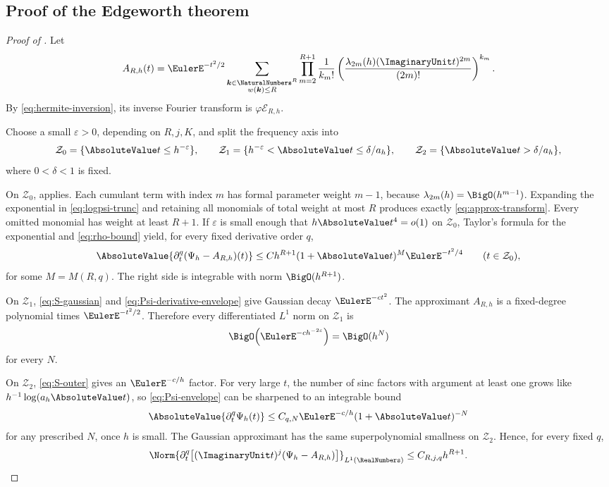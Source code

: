 \documentclass[11pt]{article}
\numberwithin{equation}{section}
\theoremstyle{definition}
\newcommand{\phiN}{\varphi}
\begin{document}
\subsection{Proof of the Edgeworth theorem}
\begin{proof}[Proof of ]
Let
\begin{equation}\label{eq:approx-transform}
 A_{R,h}(t)=\EulerE^{-t^2/2}
 \sum_{\substack{\bm k\in\NaturalNumbers^R\\w(\bm k)\le R}}
 \prod_{m=2}^{R+1}\frac1{k_m!}
 \left(\frac{\lambda_{2m}(h)(\ImaginaryUnit t)^{2m}}{(2m)!}\right)^{k_m}.
\end{equation}
By \eqref{eq:hermite-inversion}, its inverse Fourier transform is \(\phiN\mathcal E_{R,h}\).

Choose a small \(\varepsilon>0\), depending on \(R,j,K\), and split the frequency axis into
\[
 \mathcal Z_0=\{\AbsoluteValue t\le h^{-\varepsilon}\},\qquad
 \mathcal Z_1=\{h^{-\varepsilon}<\AbsoluteValue t\le\delta/a_h\},\qquad
 \mathcal Z_2=\{\AbsoluteValue t>\delta/a_h\},
\]
where \(0<\delta<1\) is fixed.

On \(\mathcal Z_0\),  applies.  Each cumulant term with index \(m\) has formal parameter weight \(m-1\), because \(\lambda_{2m}(h)=\BigO(h^{m-1})\).  Expanding the exponential in \eqref{eq:logpsi-trunc} and retaining all monomials of total weight at most \(R\) produces exactly \eqref{eq:approx-transform}.  Every omitted monomial has weight at least \(R+1\).  If \(\varepsilon\) is small enough that \(h\AbsoluteValue t^4=o(1)\) on \(\mathcal Z_0\), Taylor's formula for the exponential and \eqref{eq:rho-bound} yield, for every fixed derivative order \(q\),
\begin{equation}\label{eq:central-transform-error}
 \AbsoluteValue{\partial_t^q(\Psi_h-A_{R,h})(t)}
 \le C h^{R+1}(1+\AbsoluteValue t)^M\EulerE^{-t^2/4}
 \qquad(t\in\mathcal Z_0),
\end{equation}
for some \(M=M(R,q)\).  The right side is integrable with norm \(\BigO(h^{R+1})\).

On \(\mathcal Z_1\), \eqref{eq:S-gaussian} and \eqref{eq:Psi-derivative-envelope} give Gaussian decay \(\EulerE^{-ct^2}\).  The approximant \(A_{R,h}\) is a fixed-degree polynomial times \(\EulerE^{-t^2/2}\).  Therefore every differentiated \(L^1\) norm on \(\mathcal Z_1\) is
\[
 \BigO\!\left(\EulerE^{-c h^{-2\varepsilon}}\right)=\BigO(h^N)
\]
for every \(N\).

On \(\mathcal Z_2\), \eqref{eq:S-outer} gives an \(\EulerE^{-c/h}\) factor.  For very large \(t\), the number of sinc factors with argument at least one grows like \(h^{-1}\log(a_h\AbsoluteValue t)\), so \eqref{eq:Psi-envelope} can be sharpened to an integrable bound
\[
 \AbsoluteValue{\partial_t^q\Psi_h(t)}
 \le C_{q,N}\EulerE^{-c/h}(1+\AbsoluteValue t)^{-N}
\]
for any prescribed \(N\), once \(h\) is small.  The Gaussian approximant has the same superpolynomial smallness on \(\mathcal Z_2\).  Hence, for every fixed \(q\),
\begin{equation}\label{eq:fourier-derivative-L1}
 \Norm{\partial_t^q\bigl[(\ImaginaryUnit t)^j(\Psi_h-A_{R,h})\bigr]}_{L^1(\RealNumbers)}
 \le C_{R,j,q}h^{R+1}.
\end{equation}


\end{proof}
\end{document}
